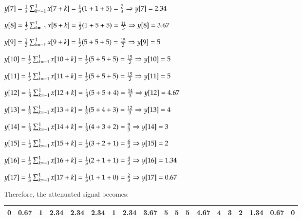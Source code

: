 \documentclass[a4paper,11pt]{article}
\begin{document}
${ y[7] = \frac{1}{3} \large\sum _{k=-1}^{1} x[7+k] = \frac{1}{3} (1+1+5) = \frac{7}{3} \Rightarrow y[7]=  2.34 }$ \newline

${ y[8] = \frac{1}{3} \large\sum _{k=-1}^{1} x[8+k] = \frac{1}{3} (1+5+5) = \frac{11}{3} \Rightarrow y[8]=  3.67 }$ \newline

${ y[9] = \frac{1}{3} \large\sum _{k=-1}^{1} x[9+k] = \frac{1}{3} (5+5+5) = \frac{15}{3} \Rightarrow y[9]=  5 }$ \newline

${ y[10] = \frac{1}{3} \large\sum _{k=-1}^{1} x[10+k] = \frac{1}{3} (5+5+5) = \frac{15}{3} \Rightarrow y[10]=  5 }$ \newline

${ y[11] = \frac{1}{3} \large\sum _{k=-1}^{1} x[11+k] = \frac{1}{3} (5+5+5) = \frac{15}{3} \Rightarrow y[11]=  5 }$ \newline

${ y[12] = \frac{1}{3} \large\sum _{k=-1}^{1} x[12+k] = \frac{1}{3} (5+5+4) = \frac{14}{3} \Rightarrow y[12]=  4.67 }$ \newline

${ y[13] = \frac{1}{3} \large\sum _{k=-1}^{1} x[13+k] = \frac{1}{3} (5+4+3) = \frac{12}{3} \Rightarrow y[13]=  4 }$ \newline

${ y[14] = \frac{1}{3} \large\sum _{k=-1}^{1} x[14+k] = \frac{1}{3} (4+3+2) = \frac{9}{3} \Rightarrow y[14]=  3 }$ \newline

${ y[15] = \frac{1}{3} \large\sum _{k=-1}^{1} x[15+k] = \frac{1}{3} (3+2+1) = \frac{6}{3} \Rightarrow y[15]=  2 }$ \newline

${ y[16] = \frac{1}{3} \large\sum _{k=-1}^{1} x[16+k] = \frac{1}{3} (2+1+1) = \frac{4}{3} \Rightarrow y[16]=  1.34 }$ \newline

${ y[17] = \frac{1}{3} \large\sum _{k=-1}^{1} x[17+k] = \frac{1}{3} (1+1+0) = \frac{2}{3} \Rightarrow y[17]=  0.67 }$ \newline

Therefore, the attenuated signal becomes: \newline
\begin{center}
\begin{tabular}{|c|c|c|c|c|c|c|c|c|c|c|c|c|c|c|c|c|c|c|}
\hline
 0 \cellcolor{lightgray}&0.67&1&	2.34&	2.34&	2.34&	1&	2.34&	3.67&	5&	5&	5&	4.67&	4&	3&	2&	1.34&	0.67&	0 \cellcolor{lightgray}\\
 \hline
\end{tabular}
\end{center}
\end{document}
